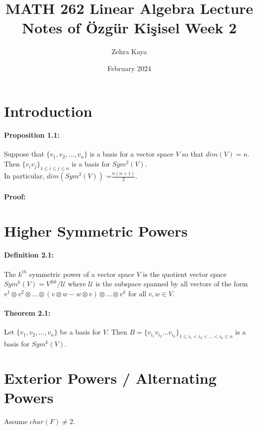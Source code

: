 \documentclass{article}
\title{MATH 262 Linear Algebra
Lecture Notes of Özgür Kişisel Week 2}
\author{Zehra Kaya}
\date{February 2024}
\begin{document}
\maketitle
\tableofcontents


\section{Introduction}



\paragraph{Proposition 1.1:} Suppose that $\{v_1,v_2,...,v_n\}$ is a basis for a vector space $V$ so that  $dim(V)=n $. 
Then $\{v_iv_j\}_{1\leq i\leq j\leq n}$ is a basis for $Sym^2(V)$.\\

In particular,  $dim(Sym^2(V))$ =$\frac{n(n+1)}{2}$.

\paragraph{Proof:} 
\section{Higher Symmetric Powers}
\paragraph{Definition 2.1:} The $k^{th}$ symmetric power of a vector space $V$ is the quotient vector space $Sym^k(V) = V^{\otimes k}/\mathcal{U}$ where $\mathcal{U}$ is the subspace spanned by all vectors of the form $v^1\otimes v^2\otimes...\otimes( v\otimes w-w\otimes v) \otimes...\otimes v^k$ for all $v,w\in V$.

\paragraph{Theorem 2.1:} Let $\{v_1,v_2,...,v_n\}$ be a basis for $V$. Then $B= \{v_{i_1}v_{i_2}...v_{i_k}\}_{1\leq i_1< i_2<...< i_k\leq n}$ is a basis for $Sym^k(V)$.\\




\section{Exterior Powers / Alternating Powers}
Assume $char(F)\neq 2$.\\
\end{document}
